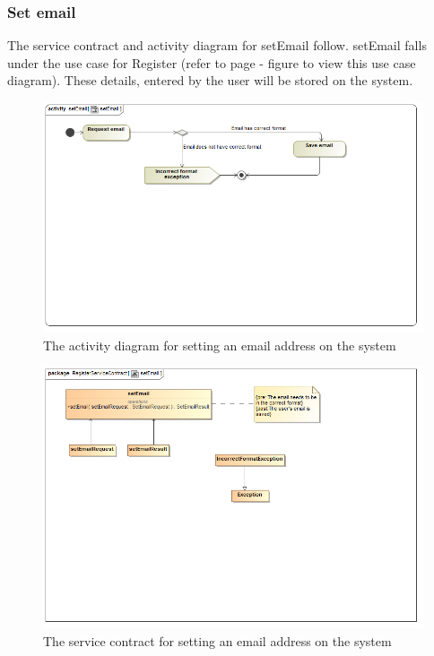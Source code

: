 \documentclass[a4paper,12pt]{report}
\begin{document}
\subsubsection{Set email}
The service contract and activity diagram for setEmail follow. setEmail falls under the use case for Register (refer to page   - figure  to view this use case diagram). These details, entered by the user will be stored on the system.
\begin{figure}[H]
  \centering
    \includegraphics[width=1.0\textwidth]{../Diagrams/Register/ActivityDiagrams/setEmail1.png}
    \caption{The activity diagram for setting an email address on the system} 
\end{figure}
\begin{figure}[H]
  \centering
    \includegraphics[width=1.0\textwidth]{../Diagrams/Register/ServiceContractsRegister/setEmailServiceContract.png}
    \caption{The service contract for setting an email address on the system} 
\end{figure}
\end{document}

